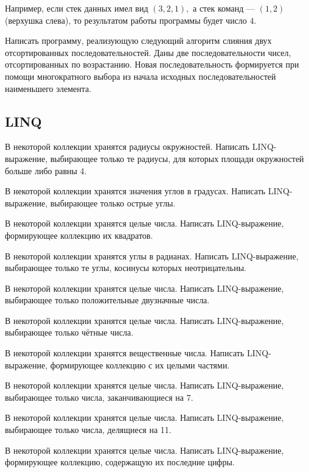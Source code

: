 Например, если стек данных имел вид $(3, 2, 1),$ а стек команд —
$(1, 2)$ (верхушка слева), то результатом работы программы будет число
$4$.

\task Написать программу, реализующую следующий алгоритм слияния двух
отсортированных последовательностей. Даны две последовательности
чисел, отсортированных по возрастанию. Новая последовательность
формируется при помощи многократного выбора из начала исходных
последовательностей наименьшего элемента.


\subsection{LINQ}

\task В некоторой коллекции хранятся радиусы окружностей. Написать
LINQ-выражение, выбирающее только те радиусы, для которых площади
окружностей больше либо равны 4.

\task В некоторой коллекции хранятся значения углов в
градусах. Написать LINQ-выражение, выбирающее только острые углы.

\task В некоторой коллекции хранятся целые числа. Написать
LINQ-выражение, формирующее коллекцию их квадратов.

\task В некоторой коллекции хранятся углы в радианах. Написать
LINQ-выражение, выбирающее только те углы, косинусы которых
неотрицательны.

\task В некоторой коллекции хранятся целые числа. Написать
LINQ-выражение, выбирающее только положительные двузначные числа.

\task В некоторой коллекции хранятся целые числа. Написать
LINQ-выражение, выбирающее только чётные числа.

\task В некоторой коллекции хранятся вещественные числа. Написать
LINQ-выражение, формирующее коллекцию с их целыми частями.

\task В некоторой коллекции хранятся целые числа. Написать
LINQ-выражение, выбирающее только числа, заканчивающиеся на 7.

\task В некоторой коллекции хранятся целые числа. Написать
LINQ-выражение, выбирающее только числа, делящиеся на 11.

\task В некоторой коллекции хранятся целые числа. Написать
LINQ-выражение, формирующее коллекцию, содержащую их последние цифры.
